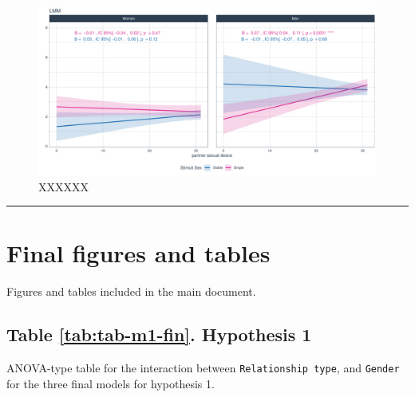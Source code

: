 \documentclass[
  bookmarksnumbered]{article}
\begin{document}
\begin{figure}
\centering
\includegraphics{Sexual_Desire_Arousal_V2_files/figure-latex/fig-h3c-1.pdf}
\caption{\label{fig:fig-h3c}XXXXXX}
\end{figure}

\begin{center}\rule{0.5\linewidth}{0.5pt}\end{center}

\closesupplement

\section{Final figures and tables}\label{final-figures-and-tables}

Figures and tables included in the main document.

\subsection{Table \ref{tab:tab-m1-fin}. Hypothesis 1}\label{table-reftabtab-m1-fin.-hypothesis-1}

ANOVA-type table for the interaction between \texttt{Relationship\ type}, and \texttt{Gender} for the three final models for hypothesis 1.
\end{document}

